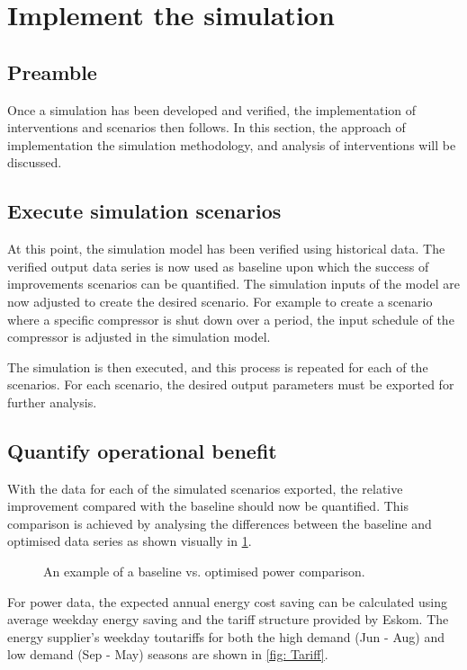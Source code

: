 \section{Implement the simulation}
	\subsection{Preamble}
		Once a simulation has been developed and verified, the implementation of interventions and scenarios then follows. In this section, the approach of implementation the simulation methodology, and analysis of interventions will be discussed.
	\subsection{Execute simulation scenarios}
		At this point, the simulation model has been verified using historical data. The verified output data series is now used as baseline upon which the success of improvements scenarios can be quantified.  The simulation inputs of the model are now adjusted to create the desired scenario. For example to create a scenario where a specific compressor is shut down over a period, the input schedule of the compressor is adjusted in the simulation model.
		\par
		The simulation is then executed, and this process is repeated for each of the scenarios. For each scenario, the desired output parameters must be exported for further analysis.

	\subsection{Quantify operational benefit}
		With the data for each of the simulated scenarios exported, the relative improvement compared with the baseline should now be quantified. This comparison is achieved by analysing the differences between the baseline and optimised data series as shown visually in \cref{fig: Savings Power.}.
		\begin{figure}[h]
			\centering
			
			\caption{An example of a baseline vs. optimised power comparison.}
			\label{fig: Savings Power.}
		\end{figure} 
		
		For power data, the expected annual energy cost saving can be calculated using average weekday energy saving and the tariff structure provided by Eskom. The energy supplier's weekday \gls{tou}tariffs for both the high demand (Jun - Aug) and low demand (Sep - May) seasons are shown in \cref{fig: Tariff}.

